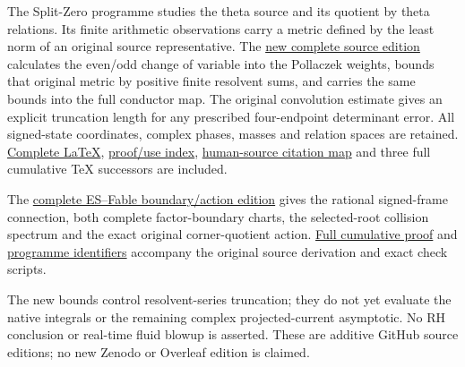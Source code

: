 \documentclass[
]{article}
\begin{document}
The Split-Zero programme studies the theta source and its quotient by
theta relations. Its finite arithmetic observations carry a metric
defined by the least norm of an original source representative. The
\href{https://github.com/KokunoYumeto/zeta-function-research-reader/blob/main/workbenches/splitzero-tandem/continuations/20260920-native-parity-conductor-return/README.md}{new
complete source edition} calculates the even/odd change of variable into
the Pollaczek weights, bounds that original metric by positive finite
resolvent sums, and carries the same bounds into the full conductor map.
The original convolution estimate gives an explicit truncation length
for any prescribed four-endpoint determinant error. All signed-state
coordinates, complex phases, masses and relation spaces are retained.
\href{https://github.com/KokunoYumeto/zeta-function-research-reader/blob/main/workbenches/splitzero-tandem/continuations/20260920-native-parity-conductor-return/LITERATURE_RECEIVERS_COMPLETE.tex}{Complete
LaTeX},
\href{https://github.com/KokunoYumeto/zeta-function-research-reader/blob/main/workbenches/splitzero-tandem/continuations/20260920-native-parity-conductor-return/RESULT_INDEX.json}{proof/use
index},
\href{https://github.com/KokunoYumeto/zeta-function-research-reader/blob/main/workbenches/splitzero-tandem/continuations/20260920-native-parity-conductor-return/CITATION_USE_MAP.json}{human-source
citation map} and three full cumulative TeX successors are included.

The
\href{https://github.com/KokunoYumeto/zeta-function-research-reader/blob/main/workbenches/splitzero-tandem/continuations/20260920-fable-boundary-action/README.md}{complete
ES--Fable boundary/action edition} gives the rational signed-frame
connection, both complete factor-boundary charts, the selected-root
collision spectrum and the exact original corner-quotient action.
\href{https://github.com/KokunoYumeto/zeta-function-research-reader/blob/main/workbenches/splitzero-tandem/continuations/20260920-fable-boundary-action/FABLE_TO_ORIGINAL_CONDUCTOR.tex}{Full
cumulative proof} and
\href{https://github.com/KokunoYumeto/zeta-function-research-reader/blob/main/workbenches/splitzero-tandem/continuations/20260920-fable-boundary-action/PROGRAMME_ALIASES.md}{programme
identifiers} accompany the original source derivation and exact check
scripts.

The new bounds control resolvent-series truncation; they do not yet
evaluate the native integrals or the remaining complex projected-current
asymptotic. No RH conclusion or real-time fluid blowup is asserted.
These are additive GitHub source editions; no new Zenodo or Overleaf
edition is claimed.
\end{document}
